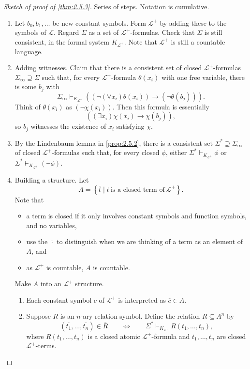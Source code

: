 \documentclass{article}
\renewcommand{\L}{\mathcal{L}}
\newcommand{\rb}[1]{\left( #1 \right)}
\newcommand{\cb}[1]{\left\{ #1 \right\}}
\newcommand{\notb}[1]{\rb{\neg #1}}
\newcommand{\impb}[2]{\rb{#1 \rightarrow #2}}
\newcommand{\fab}[1]{\rb{\forall #1}}
\newcommand{\teb}[1]{\rb{\exists #1}}
\theoremstyle{definition}\newtheorem{definition}{Definition}[subsection]
\theoremstyle{definition}\newtheorem{remark1}[definition]{Remark}
\theoremstyle{definition}\newtheorem{example1}[definition]{Example}
\theoremstyle{definition}\newtheorem*{remark2}{Remark}
\theoremstyle{definition}\newtheorem*{example2}{Example}
\theoremstyle{definition}\newtheorem*{note}{Note}
\theoremstyle{definition}\newtheorem*{notation}{Notation}
\begin{document}
\begin{proof}[Sketch of proof of \ref{thm:2.5.3}]
Series of steps. Notation is cumulative.
\begin{enumerate}[leftmargin=0.5in, label=Step \arabic*.]
\item Let $ b_0, b_1, \dots $ be new constant symbols. Form $ \L^+ $ by adding these to the symbols of $ \L $. Regard $ \Sigma $ as a set of $ \L^+ $-formulas. Check that $ \Sigma $ is still consistent, in the formal system $ K_{\L^+} $. Note that $ \L^+ $ is still a countable language.
\item Adding witnesses. Claim that there is a consistent set of closed $ \L^+ $-formulas $ \Sigma_\infty \supseteq \Sigma $ such that, for every $ \L^+ $-formula $ \theta\rb{x_i} $ with one free variable, there is some $ b_j $ with
$$ \Sigma_\infty \vdash_{K_{\L^+}} \impb{\notb{\fab{x_i}\theta\rb{x_i}}}{\notb{\theta\rb{b_j}}}. $$
Think of $ \theta\rb{x_i} $ as $ \notb{\chi\rb{x_i}} $. Then this formula is essentially
$$ \impb{\teb{x_i}\chi\rb{x_i}}{\chi\rb{b_j}}, $$
so $ b_j $ witnesses the existence of $ x_i $ satisfying $ \chi $.
\item By the Lindenbaum lemma in \ref{prop:2.5.2}, there is a consistent set $ \Sigma^* \supseteq \Sigma_\infty $ of closed $ \L^+ $-formulas such that, for every closed $ \phi $, either $ \Sigma^* \vdash_{K_{\L^+}} \phi $ or $ \Sigma^* \vdash_{K_{\L^+}} \notb{\phi} $.
\item Building a structure. Let
$$ A = \cb{\overline{t} \mid t \ \text{is a closed term of} \ \L^+}. $$
Note that
\begin{itemize}
\item a term is closed if it only involves constant symbols and function symbols, and no variables,
\item use the $ \overline{\cdot} $ to distinguish when we are thinking of a term as an element of $ A $, and
\item as $ \L^+ $ is countable, $ A $ is countable.
\end{itemize}
Make $ A $ into an $ \L^+ $ structure.
\begin{enumerate}
\item Each constant symbol $ c $ of $ \L^+ $ is interpreted as $ \overline{c} \in A $.
\item Suppose $ R $ is an $ n $-ary relation symbol. Define the relation $ \overline{R} \subseteq A^n $ by
$$ \rb{\overline{t_1}, \dots, \overline{t_n}} \in \overline{R} \qquad \iff \qquad \Sigma^* \vdash_{K_{\L^+}} R\rb{t_1, \dots, t_n}, $$
where $ R\rb{t_1, \dots, t_n} $ is a closed atomic $ \L^+ $-formula and $ t_1, \dots, t_n $ are closed $ \L^+ $-terms.

\end{enumerate}
\end{enumerate}
\end{proof}
\end{document}
